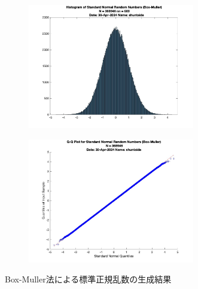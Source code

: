 \begin{figure}
	\centering
	\begin{subfigure}{0.48\linewidth}
		\centering
		\includegraphics[width=0.8\textwidth]{src/figures/box-muller/Box-Muller_hist_N=368946_nn=500.jpg}
	\end{subfigure}
	\begin{subfigure}{0.48\linewidth}
		\centering
		\includegraphics[width=0.8\textwidth]{src/figures/box-muller/Box-Muller_qqpl_N=368946.jpg}
	\end{subfigure}
	\caption{Box-Muller法による標準正規乱数の生成結果}\label{fig:box-muller-random}
\end{figure}
